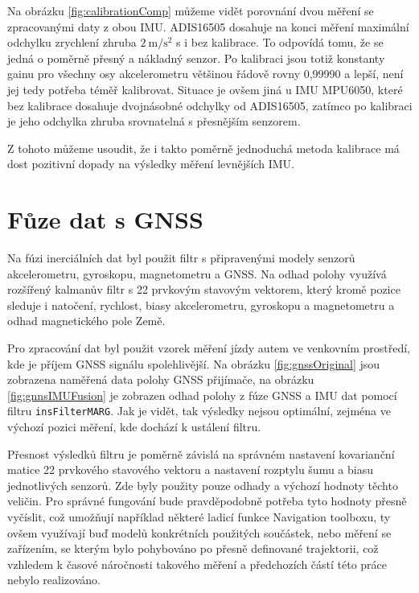 Na obrázku \ref{fig:calibrationComp} můžeme vidět porovnání dvou měření se zpracovanými daty z obou IMU. ADIS16505 dosahuje na konci měření maximální odchylku zrychlení zhruba $ \SI[per-mode = symbol]{2}{\metre\per\second\squared} $ s i bez kalibrace. To odpovídá tomu, že se jedná o poměrně přesný a nákladný senzor. Po kalibraci jsou totiž konstanty gainu pro všechny osy akcelerometru většinou řádově rovny 0,99990 a lepší, není jej tedy potřeba téměř kalibrovat. Situace je ovšem jiná u IMU MPU6050, které bez kalibrace dosahuje dvojnásobné odchylky od ADIS16505, zatímco po kalibraci je jeho odchylka zhruba srovnatelná s přesnějším senzorem.

Z tohoto můžeme usoudit, že i takto poměrně jednoduchá metoda kalibrace má dost pozitivní dopady na výsledky měření levnějších IMU.

\section{Fůze dat s GNSS}
Na fúzi inerciálních dat byl použit filtr s připravenými modely senzorů akcelerometru, gyroskopu, magnetometru a GNSS. Na odhad polohy využívá rozšířený kalmanův filtr s 22 prvkovým stavovým vektorem, který kromě pozice sleduje i natočení, rychlost, biasy akcelerometru, gyroskopu a magnetometru a odhad magnetického pole Země. \cite{M7nvHLyk8N0V3ub2}

Pro zpracování dat byl použit vzorek měření jízdy autem ve venkovním prostředí, kde je  příjem GNSS signálu spolehlivější. Na obrázku \ref{fig:gnssOriginal} jsou zobrazena naměřená data polohy GNSS přijímače, na obrázku \ref{fig:gnnsIMUFusion} je zobrazen odhad polohy z fúze GNSS a IMU dat pomocí filtru \texttt{insFilterMARG}. Jak je vidět, tak výsledky nejsou optimální, zejména ve výchozí pozici měření, kde dochází k ustálení filtru.

Přesnost výsledků filtru je poměrně závislá na správném nastavení kovarianční matice 22 prvkového stavového vektoru a nastavení rozptylu šumu a biasu jednotlivých senzorů. Zde byly použity pouze odhady a výchozí hodnoty těchto veličin. Pro správné fungování bude pravděpodobně potřeba tyto hodnoty přesně vyčíslit, což umožňují například některé ladicí funkce Navigation toolboxu, ty ovšem využívají buď modelů konkrétních použitých součástek, nebo měření se zařízením, se kterým bylo pohybováno po přesně definované trajektorii, což vzhledem k časové náročnosti takového měření a předchozích částí této práce nebylo realizováno.  

